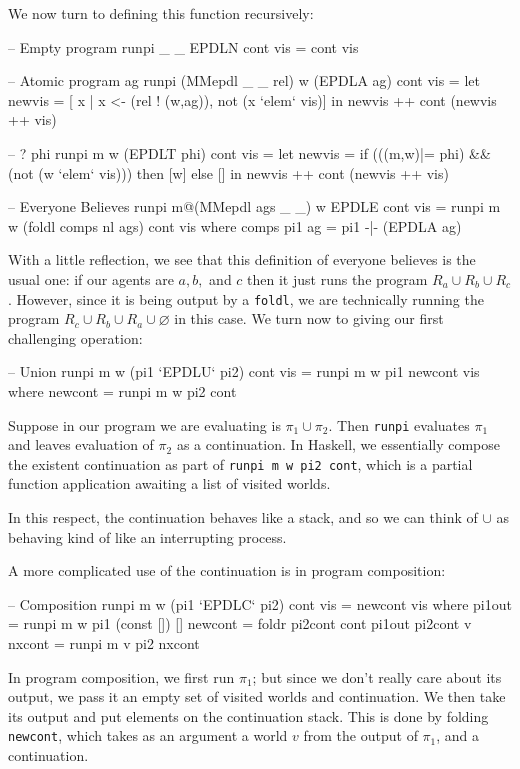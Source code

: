 \documentclass[11pt]{article}
\theoremstyle{definition}
\begin{document}
We now turn to defining this function recursively:
\begin{code}
-- Empty program
runpi _ _ EPDLN cont vis = cont vis

-- Atomic program ag
runpi (MMepdl _ _ rel) w (EPDLA ag) cont vis = 
  let newvis = [ x | x <- (rel ! (w,ag)), not (x `elem` vis)] in
    newvis ++ cont (newvis ++ vis)

-- ? phi
runpi m w (EPDLT phi) cont vis =
  let newvis = if (((m,w)|= phi) && (not (w `elem` vis))) then [w] else [] in
    newvis ++ cont (newvis ++ vis)

-- Everyone Believes
runpi m@(MMepdl ags _ _) w EPDLE cont vis =
  runpi m w (foldl comps nl ags) cont vis
   where
     comps pi1 ag = pi1 -|- (EPDLA ag) 
\end{code}

With a little reflection, we see that this definition of everyone believes is the usual one: if our agents are $a,b,$ and $c$ then it just runs the program $R_a \cup R_b \cup R_c$.  However, since it is being output by a \texttt{foldl}, we are technically running the program $R_c \cup R_b \cup R_a \cup \varnothing$ in this case.  We turn now to giving our first challenging operation:

\begin{code}
-- Union
runpi m w (pi1 `EPDLU` pi2) cont vis =
  runpi m w pi1 newcont vis
    where
      newcont = runpi m w pi2 cont
\end{code}

Suppose in our program we are evaluating is $\pi_1 \cup \pi_2$. Then \texttt{runpi} evaluates $\pi_1$ and leaves evaluation of $\pi_2$ as a continuation.  In Haskell, we essentially compose the existent continuation as part of \texttt{runpi m w pi2 cont}, which is a partial function application awaiting a list of visited worlds.

In this respect, the continuation behaves like a stack, and so we can think of $\cup$ as behaving kind of like an interrupting process.

A more complicated use of the continuation is in program composition:
\begin{code}
-- Composition
runpi m w (pi1 `EPDLC` pi2) cont vis =
  newcont vis
    where
      pi1out = runpi m w pi1 (const []) []
      newcont = foldr pi2cont cont pi1out
      pi2cont v nxcont = runpi m v pi2 nxcont
\end{code}

In program composition, we first run $\pi_1$; but since we don't really care about its output, we pass it an empty set of visited worlds and continuation.  We then take its output and put elements on the continuation stack.  This is done by folding \texttt{newcont}, which takes as an argument a world $v$ from the output of $\pi_1$, and a continuation.
\end{document}
